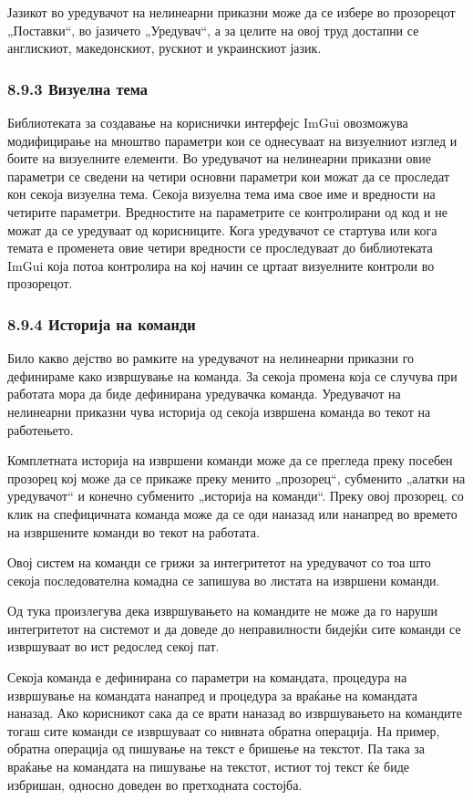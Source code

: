Јазикот во уредувачот на нелинеарни приказни може да се избере во прозорецот „Поставки“, во јазичето „Уредувач“, а за целите на овој труд достапни се англискиот, македонскиот, рускиот и украинскиот јазик.

\subsubsection{8.9.3 Визуелна тема}

Библиотеката за создавање на кориснички интерфејс ImGui овозможува модифицирање на мноштво параметри кои се однесуваат на визуелниот изглед и боите на визуелните елементи. Во уредувачот на нелинеарни приказни овие параметри се сведени на четири основни параметри кои можат да се проследат кон секоја визуелна тема. Секоја визуелна тема има свое име и вредности на четирите параметри. Вредностите на параметрите се контролирани од код и не можат да се уредуваат од корисниците. Кога уредувачот се стартува или кога темата е променета овие четири вредности се проследуваат до библиотеката ImGui која потоа контролира на кој начин се цртаат визуелните контроли во прозорецот.

\subsubsection{8.9.4 Историја на команди}

Било какво дејство во рамките на уредувачот на нелинеарни приказни го дефинираме како извршување на команда. За секоја промена која се случува при работата мора да биде дефинирана уредувачка команда. Уредувачот на нелинеарни приказни чува историја од секоја извршена команда во текот на работењето.

Комплетната историја на извршени команди може да се прегледа преку посебен прозорец кој може да се прикаже преку менито „прозорец“, субменито „алатки на уредувачот“ и конечно субменито „историја на команди“. Преку овој прозорец, со клик на спефицичната команда може да се оди наназад или нанапред во времето на извршените команди во текот на работата.

Овој систем на команди се грижи за интегритетот на уредувачот со тоа што секоја последователна комадна се запишува во листата на извршени команди.

Од тука произлегува дека извршувањето на командите не може да го наруши интегритетот на системот и да доведе до неправилности бидејќи сите команди се извршуваат во ист редослед секој пат.

Секоја команда е дефинирана со параметри на командата, процедура на извршување на командата нанапред и процедура за враќање на командата наназад. Ако корисникот сака да се врати наназад во извршувањето на командите тогаш сите команди се извршуваат со нивната обратна операција. На пример, обратна операција од пишување на текст е бришење на текстот. Па така за враќање на командата на пишување на текстот, истиот тој текст ќе биде избришан, односно доведен во претходната состојба.


